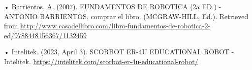 •	Barrientos, A. (2007). FUNDAMENTOS DE ROBOTICA (2a ED.) - ANTONIO BARRIENTOS, comprar el libro. (MCGRAW-HILL, Ed.). Retrieved from \url{http://www.casadellibro.com/libro-fundamentos-de-robotica-2-ed/9788448156367/1132459}

• Intelitek. (2023, April 3). SCORBOT ER-4U EDUCATIONAL ROBOT - Intelitek. \url{https://intelitek.com/scorbot-er-4u-educational-robot/}